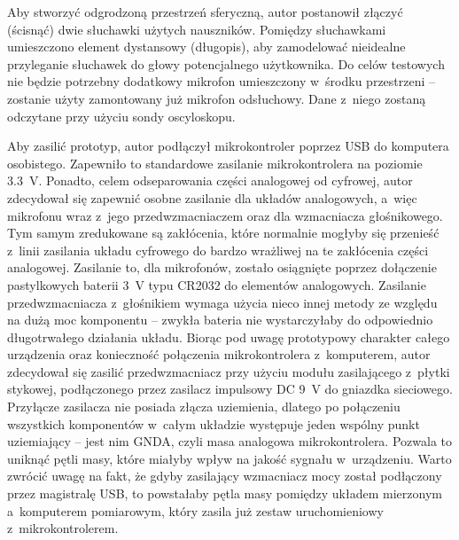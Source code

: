 Aby stworzyć odgrodzoną przestrzeń sferyczną, autor postanowił złączyć (ścisnąć) dwie słuchawki użytych nauszników. Pomiędzy słuchawkami umieszczono element dystansowy (długopis), aby zamodelować nieidealne przyleganie słuchawek do głowy potencjalnego użytkownika. Do celów testowych nie będzie potrzebny dodatkowy mikrofon umieszczony w~środku przestrzeni -- zostanie użyty zamontowany już mikrofon odsłuchowy. Dane z~niego zostaną odczytane przy użyciu sondy oscyloskopu.

Aby zasilić prototyp, autor podłączył mikrokontroler poprzez USB do komputera osobistego. Zapewniło to standardowe zasilanie mikrokontrolera na poziomie \SI{3.3}{\V}. Ponadto, celem odseparowania części analogowej od cyfrowej, autor zdecydował się zapewnić osobne zasilanie dla układów analogowych, a~więc mikrofonu wraz z~jego przedwzmacniaczem oraz dla wzmacniacza głośnikowego. Tym samym zredukowane są zakłócenia, które normalnie mogłyby się przenieść z~linii zasilania układu cyfrowego do bardzo wrażliwej na te zakłócenia części analogowej. Zasilanie to, dla mikrofonów, zostało osiągnięte poprzez dołączenie pastylkowych baterii \SI{3}{\V} typu CR2032 do elementów analogowych. Zasilanie przedwzmacniacza z~głośnikiem wymaga użycia nieco innej metody ze względu na dużą moc komponentu -- zwykła bateria nie wystarczyłaby do odpowiednio długotrwałego działania układu. Biorąc pod uwagę prototypowy charakter całego urządzenia oraz konieczność połączenia mikrokontrolera z~komputerem, autor zdecydował się zasilić przedwzmacniacz przy użyciu modułu zasilającego z~płytki stykowej, podłączonego przez zasilacz impulsowy DC \SI{9}{\V} do gniazdka sieciowego. Przyłącze zasilacza nie posiada złącza uziemienia, dlatego po połączeniu wszystkich komponentów w~całym układzie występuje jeden wspólny punkt uziemiający -- jest nim GNDA, czyli masa analogowa mikrokontrolera. Pozwala to uniknąć pętli masy, które miałyby wpływ na jakość sygnału w~urządzeniu. Warto zwrócić uwagę na fakt, że gdyby zasilający wzmacniacz mocy został podłączony przez magistralę USB, to powstałaby pętla masy pomiędzy układem mierzonym a~komputerem pomiarowym, który zasila już zestaw uruchomieniowy z~mikrokontrolerem.